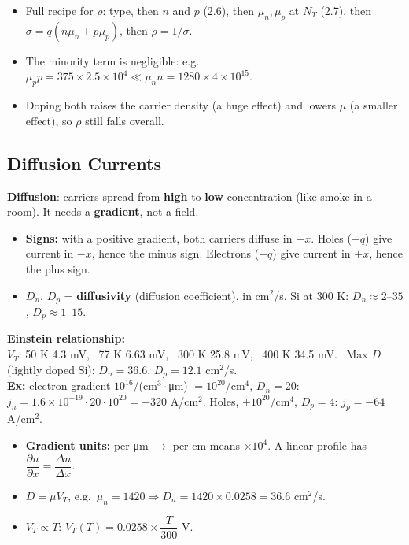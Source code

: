     \begin{handy}
        \begin{itemize}
            \item Full recipe for $\rho$: type, then $n$ and $p$ (2.6), then $\mu_n, \mu_p$ at $N_T$ (2.7), then $\sigma = q(n\mu_n + p\mu_p)$, then $\rho = 1/\sigma$.
            \item The minority term is negligible: e.g.\ $\mu_pp = 375\times2.5\times10^4 \ll \mu_nn = 1280\times4\times10^{15}$.
            \item Doping both raises the carrier density (a huge effect) and lowers $\mu$ (a smaller effect), so $\rho$ still falls overall.
        \end{itemize}
    \end{handy}

    \subsection[2.8]{Diffusion Currents}
    \textbf{Diffusion}: carriers spread from \textbf{high} to \textbf{low} concentration (like smoke in a room). It needs a \textbf{gradient}, not a field.
    \begin{itemize}
        \item \textbf{Signs:} with a positive gradient, both carriers diffuse in $-x$. Holes ($+q$) give current in $-x$, hence the minus sign. Electrons ($-q$) give current in $+x$, hence the plus sign.
        \item $D_n$, $D_p$ = \textbf{diffusivity} (diffusion coefficient), in cm$^2$/s. Si at 300 K: $D_n \approx 2$--$35$, $D_p \approx 1$--$15$.
    \end{itemize}
    \textbf{Einstein relationship:} 
    \
    \\
    $V_T$: 50 K 4.3 mV, \ 77 K 6.63 mV, \ 300 K 25.8 mV, \ 400 K 34.5 mV. \ Max $D$ (lightly doped Si): $D_n = 36.6$, $D_p = 12.1$ cm$^2$/s.\\
    \textbf{Ex:} electron gradient $10^{16}$/(cm$^3\cdot$\si{\micro\metre}) $= 10^{20}$/cm$^4$, $D_n = 20$: $j_n = 1.6\times10^{-19}\cdot20\cdot10^{20} = +320$ A/cm$^2$. Holes, $+10^{20}$/cm$^4$, $D_p = 4$: $j_p = -64$ A/cm$^2$.

    \begin{handy}
        \begin{itemize}
            \item \textbf{Gradient units:} per \si{\micro\metre} $\to$ per cm means $\times10^4$. A linear profile has $\dfrac{\partial n}{\partial x} = \dfrac{\Delta n}{\Delta x}$.
            \item $D = \mu V_T$, e.g.\ $\mu_n = 1420 \Rightarrow D_n = 1420\times0.0258 = 36.6$ cm$^2$/s.
            \item $V_T \propto T$: $V_T(T) = 0.0258\times\dfrac{T}{300}$ V.
        \end{itemize}
    \end{handy}

